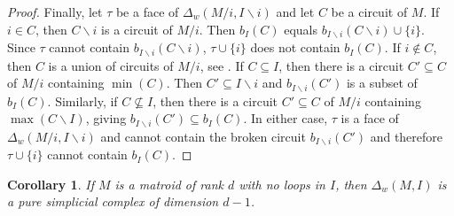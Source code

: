 \documentclass[10pt]{amsart}
\newtheorem{coro}[theo]{Corollary}
\theoremstyle{definition}
\begin{document}
\begin{proof}
Finally, let $\tau$ be a face of $\Delta_w(M/ i ,I\backslash i)$ and let $C$ be a circuit of $M$. 
If $i\in C$, then $C\backslash i $ is a circuit of $M/i$. Then 
$b_I(C)$ equals $b_{I\backslash i}(C\backslash i)\cup \{i\}$. Since $\tau$ cannot contain $b_{I\backslash i}(C\backslash i)$, $\tau \cup\{i\}$ does not contain $b_I(C)$. 
If $i\not\in C$, then $C$ is a union of circuits of $M/i$, see \cite[\S~3.1, Exercise~2]{Oxley}. 
If $C\subseteq I$, then there is a circuit $C' \subseteq C$ of $M/i$ containing $\min(C)$. 
Then $C'\subseteq I\backslash i$ and $b_{I\backslash i}(C')$ is a subset of $b_I(C)$. 
Similarly, if $C\not\subseteq I$, then there is a circuit $C' \subseteq C$ of $M/i$ containing $\max(C\backslash I)$, 
giving $b_{I\backslash i}(C') \subseteq b_I(C)$. In either case, $\tau$ is a face of $\Delta_w(M/ i ,I\backslash i)$ and cannot contain
the broken circuit $b_{I\backslash i}(C')$ and therefore $\tau \cup \{i\}$ cannot contain $b_I(C)$.%
\end{proof}



\begin{coro} \label{cor:DeltaDim}
If $M$ is a matroid of rank $d$ with no loops in $I$, then $\Delta_w(M,I)$ is a pure simplicial complex of dimension $d-1$.
\end{coro}
\end{document}
